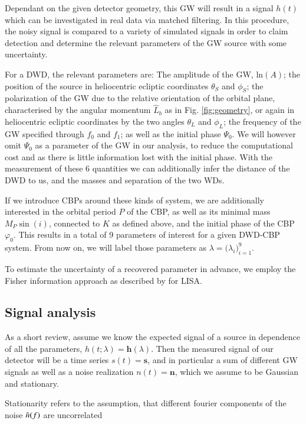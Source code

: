\documentclass{aa}
\begin{document}
Dependant on the given detector geometry, this GW will result in a signal $h(t)$ which can be investigated in real data via matched filtering. In this procedure, the noisy signal is compared to a variety of simulated signals in order to claim detection and determine the relevant parameters of the GW source with some uncertainty. 

For a DWD, the relevant parameters are: The amplitude of the GW, $\mathrm{ln}(A)$; the position of the source in heliocentric ecliptic coordinates $\theta_S$ and $\phi_S$; the polarization of the GW due to the relative orientation of the orbital plane, characterised by the angular momentum $\hat{L}_b$ as in Fig. \ref{fig:geometry}, or again in heliocentric ecliptic coordinates by the two angles $\theta_L$ and $\phi_L$; the frequency of the GW specified through $f_0$ and $f_1$; as well as the initial phase $\Psi_0$.  We will however omit $\Psi_0$ as a parameter of the GW in our analysis, to reduce the computational cost and as there is little information lost with the initial phase. With the measurement of these 6 quantities we can additionally infer the distance of the DWD to us, and the masses and separation of the two WDs.

If we introduce CBPs around these kinds of system, we are additionally interested in the orbital period $P$ of the CBP, as well as its minimal mass $M_P\sin (i)$, connected to $K$ as defined above, and the initial phase of the CBP $\varphi_0$. This results in a total of 9 parameters of interest for a given DWD-CBP system. From now on, we will label those parameters as $\lambda=\big(\lambda_i\big)_{i=1}^{9}$.

To estimate the uncertainty of a recovered parameter in advance, we employ the Fisher information approach as described by \citep{cutler} for LISA.

\subsection{Signal analysis}
\label{sec:Fisher}

As a short review, assume we know the expected signal of a source in dependence of all the parameters, $h(t;\lambda)=\mathbf{h}(\lambda)$. Then the measured signal of our detector will be a time series $s(t)=\mathbf{s}$, and in particular a sum of different GW signals as well as a noise realization $n(t)=\mathbf{n}$, which we assume to be Gaussian and stationary.

Stationarity refers to the assumption, that different fourier components of the noise $\Tilde{n}(f)$ are uncorrelated
\end{document}

